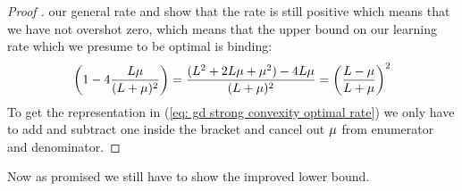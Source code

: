 \begin{proof}[Proof {\parencite[Theorem 2.1.15]{nesterovLecturesConvexOptimization2018}}]
	our general rate and show that the rate is still positive which means that
	we have not overshot zero, which means that the upper bound on our learning
	rate which we presume to be optimal is binding:
	\begin{align*}
		\left(1- 4 \frac{L\mu}{(L+\mu)^2}\right)
		= \frac{(L^2 + 2L\mu + \mu^2) - 4 L\mu}{(L+\mu)^2}
		= \left(\frac{L-\mu}{L+\mu}\right)^2
	\end{align*}
	To get the representation in (\ref{eq: gd strong convexity optimal rate}) we
	only have to add and subtract one inside the bracket and cancel out
	\(\mu\) from enumerator and denominator.
\end{proof}

Now as promised we still have to show the improved lower bound.


